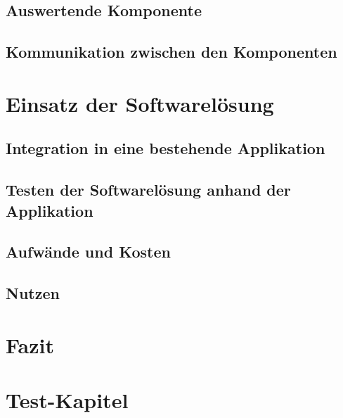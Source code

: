 \documentclass[oneside, ngerman, final, 11pt, a4paper, 1.1headlines, headinclude=false, footinclude=false, mpinclude=false, pagesize, onecolumn, titlepage, parskip=half, headsepline, chapterprefix=false, version=first, listof=totoc, bibliography=totoc, toc=graduated, fleqn, twoside=true]{scrbook}
\begin{document}
		\section{Auswertende Komponente}
		\textit{\lipsum[1]}
		
		\section{Kommunikation zwischen den Komponenten}
		\textit{\lipsum[1]}
	
	\chapter{Einsatz der Softwarelösung}
	
		\section{Integration in eine bestehende Applikation}
		\textit{\lipsum[1]}
		
		\section{Testen der Softwarelösung anhand der Applikation}
		\textit{\lipsum[1]}
		
		\section{Aufwände und Kosten}
		\textit{\lipsum[1]}
		
		\section{Nutzen}
		\textit{\lipsum[1]}
	
	\chapter{Fazit}
	
	\textit{\lipsum[1-3]}
	
	\chapter{Test-Kapitel}
	
	
	
	
	\settowidth{\nomlabelwidth}{API}
	\printnomenclature{}
	
	\newpage{}
	
	
	\listoffigures
	
	\newpage{}
	
	
	\listoftables
	
	\lstlistoflistings
	
	\newpage{}
	
	
	
\end{document}
